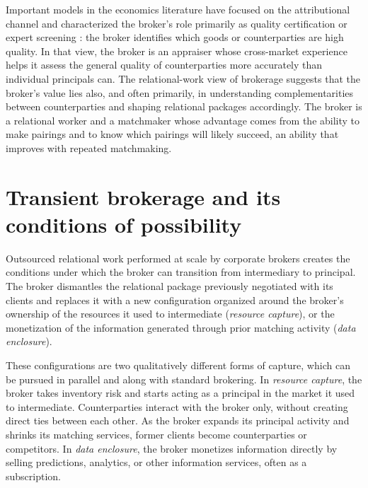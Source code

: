 \documentclass[
]{article}
\begin{document}
Important models in the economics literature have focused on the attributional channel and characterized the broker's role primarily as quality certification \autocite{liMiddlemenPrivateInformation1998} or expert screening \autocite{bethuneInformationbasedTheoryFinancial2022a}: the broker identifies which goods or counterparties are high quality. In that view, the broker is an appraiser whose cross-market experience helps it assess the general quality of counterparties more accurately than individual principals can. The relational-work view of brokerage suggests that the broker's value lies also, and often primarily, in understanding complementarities between counterparties and shaping relational packages accordingly. The broker is a relational worker and a matchmaker whose advantage comes from the ability to make pairings and to know which pairings will likely succeed, an ability that improves with repeated matchmaking.



\section{Transient brokerage and its conditions of possibility}
\label{sec:transient-brokerage}

Outsourced relational work performed at scale by corporate brokers creates the conditions under which the broker can transition from intermediary to principal. The broker dismantles the relational package previously negotiated with its clients and replaces it with a new configuration organized around the broker's ownership of the resources it used to intermediate (\emph{resource capture}), or the monetization of the information generated through prior matching activity (\emph{data enclosure}).

These configurations are two qualitatively different forms of capture, which can be pursued in parallel and along with standard brokering. In \emph{resource capture}, the broker takes inventory risk and starts acting as a principal in the market it used to intermediate. Counterparties interact with the broker only, without creating direct ties between each other. As the broker expands its principal activity and shrinks its matching services, former clients become counterparties or competitors. In \emph{data enclosure}, the broker monetizes information directly by selling predictions, analytics, or other information services, often as a subscription.
\end{document}
